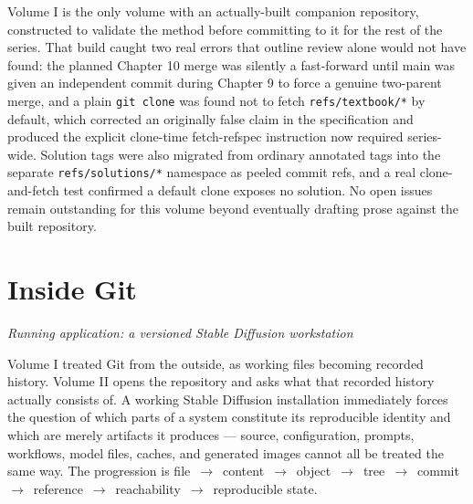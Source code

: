 \documentclass[11pt]{book}
\newcommand{\subheading}[1]{\bigskip\noindent{\bfseries\itshape #1}\smallskip\par}
\begin{document}
\subheading{Status and Open Items}
Volume I is the only volume with an actually-built companion repository, constructed to validate the method before committing to it for the rest of the series. That build caught two real errors that outline review alone would not have found: the planned Chapter 10 merge was silently a fast-forward until main was given an independent commit during Chapter 9 to force a genuine two-parent merge, and a plain \texttt{git clone} was found not to fetch \texttt{refs/textbook/*} by default, which corrected an originally false claim in the specification and produced the explicit clone-time fetch-refspec instruction now required series-wide. Solution tags were also migrated from ordinary annotated tags into the separate \texttt{refs/solutions/*} namespace as peeled commit refs, and a real clone-and-fetch test confirmed a default clone exposes no solution. No open issues remain outstanding for this volume beyond eventually drafting prose against the built repository.

\chapter{Inside Git}
\textit{Running application: a versioned Stable Diffusion workstation}

\subheading{Governing Idea}
Volume I treated Git from the outside, as working files becoming recorded history. Volume II opens the repository and asks what that recorded history actually consists of. A working Stable Diffusion installation immediately forces the question of which parts of a system constitute its reproducible identity and which are merely artifacts it produces — source, configuration, prompts, workflows, model files, caches, and generated images cannot all be treated the same way. The progression is file~$\to$~content~$\to$~object~$\to$~tree~$\to$~commit~$\to$~reference~$\to$~reachability~$\to$~reproducible state.
\end{document}
